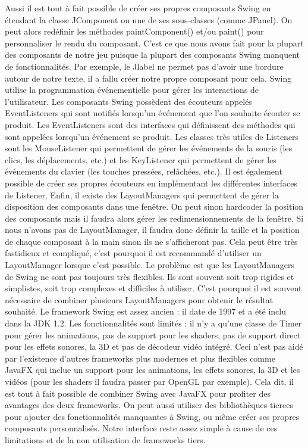 \documentclass{article}
\begin{document}
    Aussi il est tout à fait possible de créer ses propres composants Swing en étendant la classe JComponent ou une de ses sous-classes (comme JPanel).
    On peut alors redéfinir les méthodes paintComponent() et/ou paint() pour personnaliser le rendu du composant.
    C'est ce que nous avons fait pour la plupart des composants de notre jeu puisque la plupart des composants Swing manquent de fonctionnalités.
    Par exemple, le Jlabel ne permet pas d'avoir une bordure autour de notre texte, il a fallu créer notre propre composant pour cela.
    \newline
    Swing utilise la programmation événementielle pour gérer les interactions de l'utilisateur.
    Les composants Swing possèdent des écouteurs appelés EventListeners qui sont notifiés lorsqu'un événement que l'on souhaite écouter se produit.
    Les EventListeners sont des interfaces qui définissent des méthodes qui sont appelées lorsqu'un événement se produit.
    Les classes très utiles de Listeners sont les MouseListener qui permettent de gérer les événements de la souris (les clics, les déplacements, etc.) et les KeyListener qui permettent de gérer les événements du clavier (les touches pressées, relâchées, etc.).
    Il est également possible de créer ses propres écouteurs en implémentant les différentes interfaces de Listener.
    \newline
    Enfin, il existe des LayoutManagers qui permettent de gérer la disposition des composants dans une fenêtre.
    On peut sinon hardcoder la position des composants mais il faudra alors gérer les redimensionnements de la fenêtre.
    Si nous n'avons pas de LayoutManager, il faudra donc définir la taille et la position de chaque composant à la main sinon ils ne s'afficheront pas.
    Cela peut être très fastidieux et compliqué, c'est pourquoi il est recommandé d'utiliser un LayoutManager lorsque c'est possible.
    Le problème est que les LayoutManagers de Swing ne sont pas toujours très flexibles.
    Ils sont souvent soit trop rigides et simplistes, soit trop complexes et difficiles à utiliser.
    C'est pourquoi il est souvent nécessaire de combiner plusieurs LayoutManagers pour obtenir le résultat souhaité.
    \newline
    Le framework Swing est assez ancien : il date de 1997 et a été inclu dans la JDK 1.2.
    Les fonctionnalités sont limités : il n'y a qu'une classe de Timer pour gérer les animations, pas de support pour les shaders, pas de support direct pour les effets sonores, la 3D et pas de décodeur vidéo intégré.
    Ceci n'est pas aidé par l'existence d'autres frameworks plus modernes et plus flexibles comme JavaFX qui inclue un support pour les animations, les effets sonores, la 3D et les vidéos (pour les shaders il faudra passer par OpenGL par exemple).
    Cela dit, il est tout à fait possible de combiner Swing avec JavaFX pour profiter des avantages des deux frameworks.
    On peut aussi utiliser des bibliothèques tierces pour ajouter des fonctionnalités manquantes à Swing, ou même créer ses propres composants personnalisés.
    Notre interface reste assez simple à cause de ces limitations et de la non utilisation de frameworks tiers.    
\end{document}
